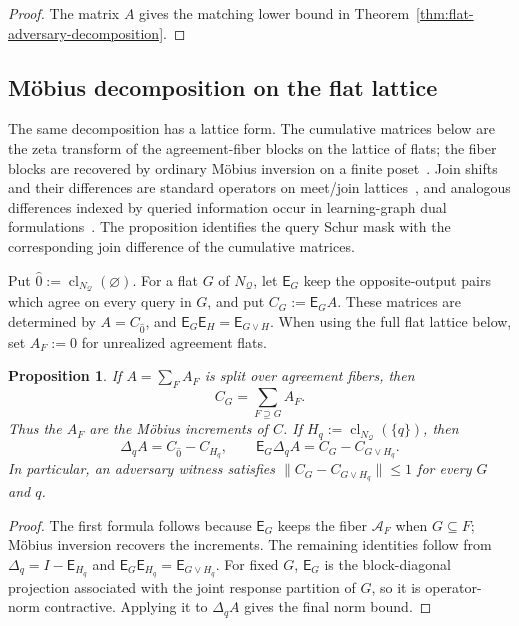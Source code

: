 \documentclass[11pt]{article}
\numberwithin{equation}{section}
\newtheorem{proposition}[definition]{Proposition}
\theoremstyle{remark}
\newcommand{\cl}{\operatorname{cl}}
\begin{document}
\begin{proof}
The matrix $A$ gives the matching lower bound in
Theorem~\ref{thm:flat-adversary-decomposition}.
\end{proof}

\subsection{M\"obius decomposition on the flat lattice}
\label{subsec:flat-potential}

The same decomposition has a lattice form. The cumulative matrices below
are the zeta transform of the agreement-fiber blocks on the lattice of flats;
the fiber blocks are recovered by ordinary M\"obius inversion on a finite
poset~\cite{Rota1964}. Join shifts and their differences are standard
operators on meet/join lattices~\cite{PuschelSeifertWendler2021}, and
analogous differences indexed by queried information occur in learning-graph
dual formulations~\cite{BelovsRosmanis2014LearningGraphs}. The proposition
identifies the query Schur mask with the corresponding join difference of the
cumulative matrices.

Put
$\widehat0:=\cl_{N_{\mathcal Q}}(\varnothing)$.  For a flat $G$ of
$N_{\mathcal Q}$, let $\mathsf E_G$ keep the opposite-output pairs which
agree on every query in $G$, and put $C_G:=\mathsf E_GA$.  These matrices are determined by $A=C_{\widehat0}$, and
$\mathsf E_G\mathsf E_H=\mathsf E_{G\vee H}$.  When using the full flat
lattice below, set $A_F:=0$ for unrealized agreement flats.

\begin{proposition}
\label{prop:mobius-source-potential}
\label{prop:source-potential-query-derivative}
If $A=\sum_FA_F$ is split over agreement fibers, then
\begin{equation}
    C_G=\sum_{F\supseteq G}A_F.
\end{equation}
Thus the $A_F$ are the M\"obius increments of $C$.  If
$H_q:=\cl_{N_{\mathcal Q}}(\{q\})$, then
\begin{equation}
    \Delta_qA=C_{\widehat0}-C_{H_q},
    \qquad
    \mathsf E_G\Delta_qA=C_G-C_{G\vee H_q}.
\end{equation}
In particular, an adversary witness satisfies
$\|C_G-C_{G\vee H_q}\|\leq1$ for every $G$ and $q$.
\end{proposition}

\begin{proof}
The first formula follows because $\mathsf E_G$ keeps the fiber
$\mathcal A_F$ when $G\subseteq F$; M\"obius inversion recovers
the increments.  The remaining identities follow from
$\Delta_q=I-\mathsf E_{H_q}$ and
$\mathsf E_G\mathsf E_{H_q}=\mathsf E_{G\vee H_q}$.  For fixed $G$, $\mathsf E_G$ is the block-diagonal projection associated with the joint response partition of $G$, so it is operator-norm contractive.  Applying it to $\Delta_qA$ gives the final norm bound.
\end{proof}
\end{document}
